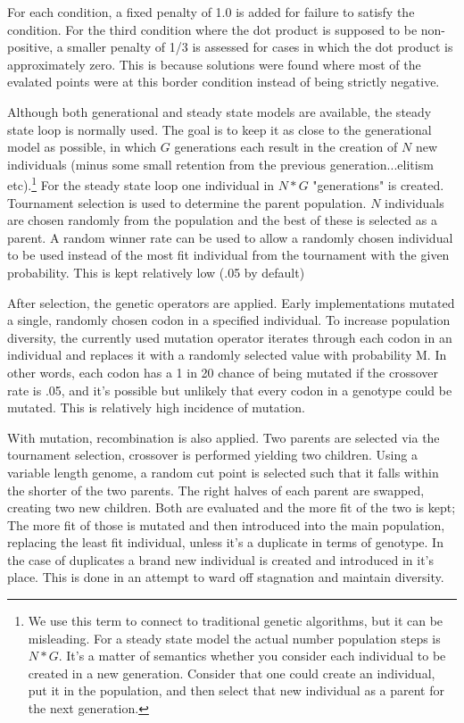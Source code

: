 \documentclass[12pt]{article}
\begin{document}
For each condition, a fixed penalty of 1.0 is added for
failure to satisfy the condition. For the third condition where the
dot product is supposed to be non-positive, a smaller penalty of 1/3
is assessed for cases in which the dot product is approximately zero.
This is because solutions were found where most of the evalated points
were at this border condition instead of being strictly negative.

Although both generational and steady state models are available, the
steady state loop is normally used.  The goal is to keep it as close
to the generational model as possible, in which $G$
generations each result in the creation
of $N$ new individuals (minus some small retention from the previous
generation...elitism etc).\footnote{We use this term to connect to traditional
  genetic algorithms, but it can be misleading. For a steady state
  model the actual number population steps is $N*G$.  It's a matter of
  semantics whether you consider each individual to be created in a
  new generation.  Consider that one could create an individual, put it
  in the population, and then select that new individual as a parent
  for the next generation.}  For the steady state loop one individual
in $N * G$ "generations" is created. Tournament selection is used to
determine the parent population. $N$ individuals are chosen randomly
from the population and the best of these is selected as a parent. A
random winner rate can be used to allow a randomly chosen individual
to be used instead of the most fit individual from the tournament with
the given probability. This is kept relatively low (.05 by default)

After selection, the genetic operators are applied.  Early
implementations mutated a single, randomly chosen codon in a specified
individual.  To increase population diversity, the currently used
mutation operator iterates through each codon in an individual and
replaces it with a randomly selected value with probability M. In
other words, each codon has a 1 in 20 chance of being mutated if the
crossover rate is .05, and it's possible but unlikely that every codon
in a genotype could be mutated. This is relatively high incidence of
mutation.  

With mutation, recombination is also applied.  Two parents are
selected via the tournament selection, crossover is performed yielding
two children.  Using a variable length genome, a random cut point is
selected such that it falls within the shorter of the two parents. The
right halves of each parent are swapped, creating two new
children. Both are evaluated and the more fit of the two is kept; The
more fit of those is mutated and then introduced into the main
population, replacing the least fit individual, unless it's a
duplicate in terms of genotype. In the case of duplicates a brand new
individual is created and introduced in it's place. This is done in an
attempt to ward off stagnation and maintain diversity.
\end{document}
